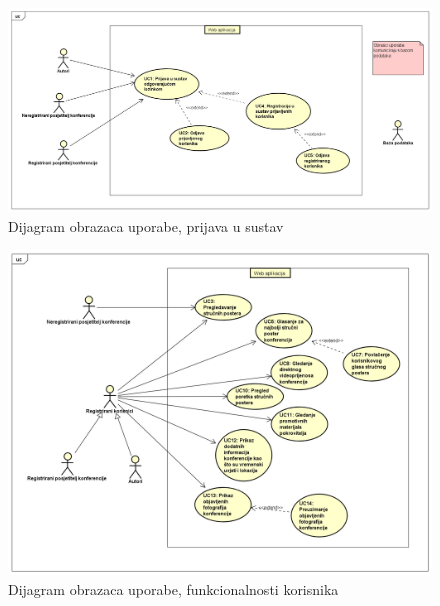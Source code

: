 					\begin{figure}[H]
						\includegraphics[width=\textwidth]{slike/prijavaUseCase.PNG} %
						\caption{Dijagram obrazaca uporabe, prijava u sustav}
						\label{fig:prijava-dijagram} %
					\end{figure}

					\begin{figure}[H]
						\includegraphics[width=\textwidth]{slike/korisniciUseCase.PNG} %
						\caption{Dijagram obrazaca uporabe, funkcionalnosti korisnika}
						\label{fig:korisnik-dijagram} %
					\end{figure}

